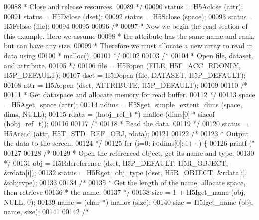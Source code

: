 \begin{DoxyCode}
00088 \textcolor{comment}{     * Close and release resources.}
00089 \textcolor{comment}{     */}
00090     status = H5Aclose (attr);
00091     status = H5Dclose (dset);
00092     status = H5Sclose (space);
00093     status = H5Fclose (file);
00094 
00095 
00096     \textcolor{comment}{/*}
00097 \textcolor{comment}{     * Now we begin the read section of this example.  Here we assume}
00098 \textcolor{comment}{     * the attribute has the same name and rank, but can have any size.}
00099 \textcolor{comment}{     * Therefore we must allocate a new array to read in data using}
00100 \textcolor{comment}{     * malloc().}
00101 \textcolor{comment}{     */}
00102 
00103     \textcolor{comment}{/*}
00104 \textcolor{comment}{     * Open file, dataset, and attribute.}
00105 \textcolor{comment}{     */}
00106     file = H5Fopen (FILE, H5F\_ACC\_RDONLY, H5P\_DEFAULT);
00107     dset = H5Dopen (file, DATASET, H5P\_DEFAULT);
00108     attr = H5Aopen (dset, ATTRIBUTE, H5P\_DEFAULT);
00109 
00110     \textcolor{comment}{/*}
00111 \textcolor{comment}{     * Get dataspace and allocate memory for read buffer.}
00112 \textcolor{comment}{     */}
00113     space = H5Aget\_space (attr);
00114     ndims = H5Sget\_simple\_extent\_dims (space, dims, NULL);
00115     rdata = (hobj\_ref\_t *) malloc (dims[0] * \textcolor{keyword}{sizeof} (hobj\_ref\_t));
00116 
00117     \textcolor{comment}{/*}
00118 \textcolor{comment}{     * Read the data.}
00119 \textcolor{comment}{     */}
00120     status = H5Aread (attr, H5T\_STD\_REF\_OBJ, rdata);
00121 
00122     \textcolor{comment}{/*}
00123 \textcolor{comment}{     * Output the data to the screen.}
00124 \textcolor{comment}{     */}
00125     \textcolor{keywordflow}{for} (i=0; i<dims[0]; i++) \{
00126         printf (\textcolor{stringliteral}{"%
00127 
00128         \textcolor{comment}{/*}
00129 \textcolor{comment}{         * Open the referenced object, get its name and type.}
00130 \textcolor{comment}{         */}
00131         obj = H5Rdereference (dset, H5P\_DEFAULT, H5R\_OBJECT, &rdata[i]);
00132         status = H5Rget\_obj\_type (dset, H5R\_OBJECT, &rdata[i], &objtype);
00133 
00134         \textcolor{comment}{/*}
00135 \textcolor{comment}{         * Get the length of the name, allocate space, then retrieve}
00136 \textcolor{comment}{         * the name.}
00137 \textcolor{comment}{         */}
00138         size = 1 + H5Iget\_name (obj, NULL, 0);
00139         name = (\textcolor{keywordtype}{char} *) malloc (size);
00140         size = H5Iget\_name (obj, name, size);
00141 
00142         \textcolor{comment}{/*}
}
\end{DoxyCode}

